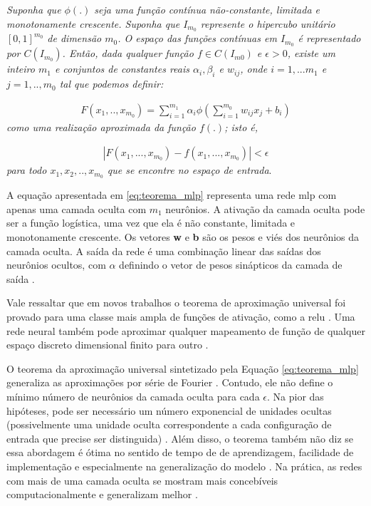\textit{Suponha que $\phi(.)$ seja uma função contínua não-constante, limitada e monotonamente crescente. Suponha que $I_{m_{0}}$ represente o hipercubo unitário $[0,1]^{m_{0}}$ de dimensão $m_{0}$. O espaço das funções contínuas em $I_{m_{0}}$ é representado por $C(I_{m_{0}})$. Então, dada qualquer função $f \in C(I_{m{0}})$ e $\epsilon>0$, existe um inteiro $m_{1}$ e conjuntos de constantes reais $\alpha_{i},\beta_{i}$ e $w_{ij}$, onde  $i = 1,...m_{1}$ e $j = 1, .., m_{0}$ tal que podemos definir:}

\begin{equation}
\label{eq:teorema_mlp}
\begin{aligned}
F(x_{1},..,x_{m_{0}}) = \sum_{i=1}^{m_{1}}\alpha_{i}\phi(\sum_{i=1}^{m_{0}}w_{ij}x_{j}+b_{i})
\end{aligned}
\end{equation}
\textit{como uma realização aproximada da função $f(.)$; isto é,}

\begin{equation}
\begin{aligned}
|F(x_{1},...,x_{m_{0}}) -f(x_{1},...,x_{m_{0}}) | < \epsilon
\end{aligned}
\end{equation}
\textit{para todo $x_{1},x_{2},..,x_{m_{0}}$ que se encontre no espaço de entrada}.

A equação apresentada em \ref{eq:teorema_mlp} representa uma rede \acrshort{mlp} com apenas uma camada oculta com $m_{1}$ neurônios. A ativação da camada oculta pode ser a função logística, uma vez que ela é não constante, limitada e monotonamente crescente. Os vetores \textbf{w} e \textbf{b} são os pesos e viés dos neurônios da camada oculta. A saída da rede é uma combinação linear das saídas dos neurônios ocultos, com \textbf{$\alpha$} definindo o vetor de pesos sinápticos da camada de saída \cite{Haykin}.  

Vale ressaltar que em novos trabalhos o teorema de aproximação universal foi provado para uma classe mais ampla de funções de ativação, como a \acrshort{relu} \cite{leshno1993multilayer}. Uma rede neural também pode aproximar qualquer mapeamento de função de qualquer espaço discreto dimensional finito para outro \cite{Goodfellow2016}.

O teorema da aproximação universal sintetizado pela Equação \ref{eq:teorema_mlp} generaliza as aproximações por série de Fourier \cite{Haykin}. Contudo, ele não define o mínimo número de neurônios  da camada oculta para cada $\epsilon$. Na pior das hipóteses, pode ser necessário um número exponencial de unidades ocultas (possivelmente uma unidade oculta correspondente a cada configuração de entrada que precise ser distinguida) \cite{Goodfellow2016}.
Além disso, o teorema também não diz se essa abordagem é ótima no sentido de tempo de de aprendizagem, facilidade de implementação e especialmente na generalização do modelo \cite{Haykin}. Na prática, as redes com mais de uma camada oculta se mostram mais concebíveis computacionalmente e generalizam melhor \cite{Goodfellow2016}.   

